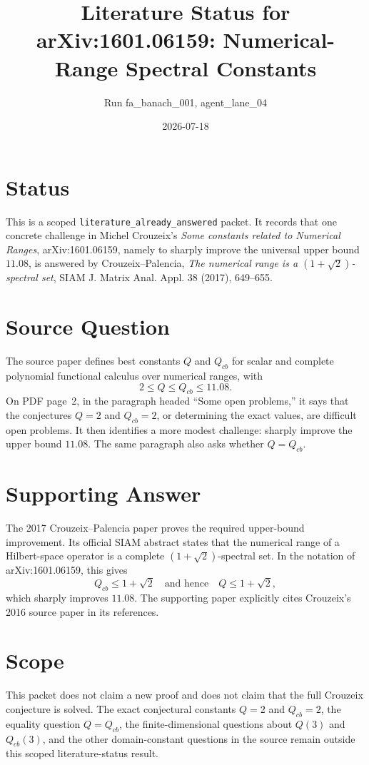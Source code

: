 \documentclass[11pt]{article}
\title{Literature Status for arXiv:1601.06159: Numerical-Range Spectral Constants}
\author{Run fa\_banach\_001, agent\_lane\_04}
\date{2026-07-18}
\begin{document}
\maketitle

\section*{Status}

This is a scoped \texttt{literature\_already\_answered} packet.  It records that
one concrete challenge in Michel Crouzeix's \emph{Some constants related to
Numerical Ranges}, arXiv:1601.06159, namely to sharply improve the universal
upper bound \(11.08\), is answered by Crouzeix--Palencia, \emph{The numerical
range is a \((1+\sqrt 2)\)-spectral set}, SIAM J. Matrix Anal. Appl. 38
(2017), 649--655.

\section*{Source Question}

The source paper defines best constants \(Q\) and \(Q_{cb}\) for scalar and
complete polynomial functional calculus over numerical ranges, with
\[
2\leq Q\leq Q_{cb}\leq 11.08.
\]
On PDF page~2, in the paragraph headed ``Some open problems,'' it says that
the conjectures \(Q=2\) and \(Q_{cb}=2\), or determining the exact values, are
difficult open problems.  It then identifies a more modest challenge: sharply
improve the upper bound \(11.08\).  The same paragraph also asks whether
\(Q=Q_{cb}\).

\section*{Supporting Answer}

The 2017 Crouzeix--Palencia paper proves the required upper-bound improvement.
Its official SIAM abstract states that the numerical range of a Hilbert-space
operator is a complete \((1+\sqrt 2)\)-spectral set.  In the notation of
arXiv:1601.06159, this gives
\[
Q_{cb}\leq 1+\sqrt 2
\quad\text{and hence}\quad
Q\leq 1+\sqrt 2,
\]
which sharply improves \(11.08\).  The supporting paper explicitly cites
Crouzeix's 2016 source paper in its references.

\section*{Scope}

This packet does not claim a new proof and does not claim that the full
Crouzeix conjecture is solved.  The exact conjectural constants \(Q=2\) and
\(Q_{cb}=2\), the equality question \(Q=Q_{cb}\), the finite-dimensional
questions about \(Q(3)\) and \(Q_{cb}(3)\), and the other domain-constant
questions in the source remain outside this scoped literature-status result.
\end{document}
